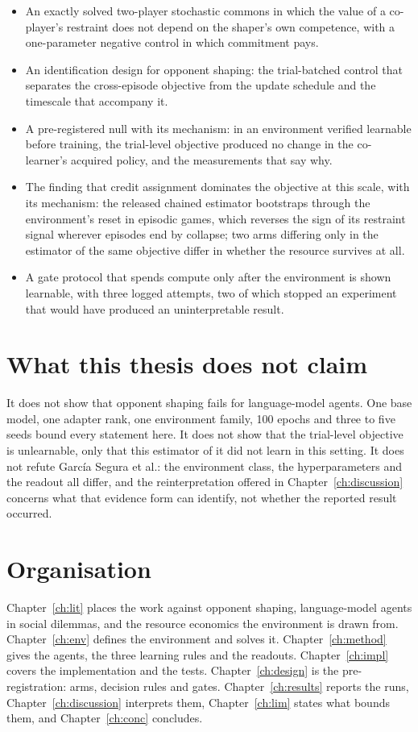 \begin{itemize}
\item An exactly solved two-player stochastic commons in which the value of
  a co-player's restraint does not depend on the shaper's own competence,
  with a one-parameter negative control in which commitment pays.
\item An identification design for opponent shaping: the trial-batched
  control that separates the cross-episode objective from the update
  schedule and the timescale that accompany it.
\item A pre-registered null with its mechanism: in an environment verified
  learnable before training, the trial-level objective produced no change in
  the co-learner's acquired policy, and the measurements that say why.
\item The finding that credit assignment dominates the objective at this
  scale, with its mechanism: the released chained estimator bootstraps
  through the environment's reset in episodic games, which reverses the
  sign of its restraint signal wherever episodes end by collapse; two arms
  differing only in the estimator of the same objective differ in whether
  the resource survives at all.
\item A gate protocol that spends compute only after the environment is
  shown learnable, with three logged attempts, two of which stopped an
  experiment that would have produced an uninterpretable result.
\end{itemize}

\section{What this thesis does not claim}
\label{sec:aims-scope}

It does not show that opponent shaping fails for language-model agents.
One base model, one adapter rank, one environment family, 100 epochs and
three to five seeds bound every statement here.
It does not show that the trial-level objective is unlearnable, only that
this estimator of it did not learn in this setting.
It does not refute Garc\'ia Segura et al.: the environment class, the
hyperparameters and the readout all differ, and the reinterpretation offered
in Chapter~\ref{ch:discussion} concerns what that evidence form can
identify, not whether the reported result occurred.

\section{Organisation}
\label{sec:aims-organisation}

Chapter~\ref{ch:lit} places the work against opponent shaping, language-model
agents in social dilemmas, and the resource economics the environment is
drawn from.
Chapter~\ref{ch:env} defines the environment and solves it.
Chapter~\ref{ch:method} gives the agents, the three learning rules and the
readouts.
Chapter~\ref{ch:impl} covers the implementation and the tests.
Chapter~\ref{ch:design} is the pre-registration: arms, decision rules and
gates.
Chapter~\ref{ch:results} reports the runs, Chapter~\ref{ch:discussion}
interprets them, Chapter~\ref{ch:lim} states what bounds them, and
Chapter~\ref{ch:conc} concludes.
